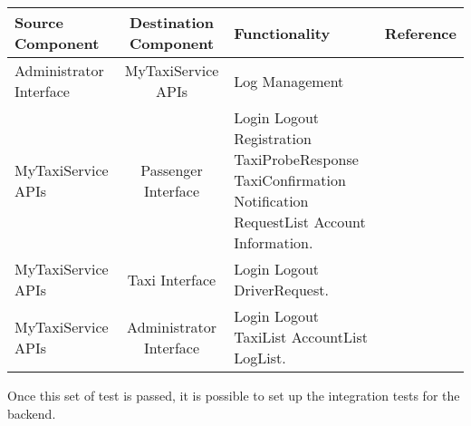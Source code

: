 \documentclass[11pt, a4paper,titlepage]{article}
\begin{document}
	\newpage
	\begin{tabularx}{\textwidth}{| X |c |X |c|}
		\hline \textbf{Source Component} &\textbf{ Destination Component}&\textbf{Functionality} & \textbf{Reference} \\
		\hline Administrator Interface & MyTaxiService APIs & Log Management &\\
		\hline MyTaxiService APIs & Passenger Interface & 
		Login\newline
		Logout\newline
		Registration\newline
		TaxiProbeResponse\newline
		TaxiConfirmation\newline
		Notification\newline
		RequestList\newline
		Account Information.
		&\\
		\hline MyTaxiService APIs & Taxi Interface & 
		Login\newline
		Logout\newline
		DriverRequest.		
		&\\
		\hline MyTaxiService APIs & Administrator Interface & 
		Login\newline
		Logout\newline
		TaxiList\newline
		AccountList\newline
		LogList.
		&\\
		\hline
	\end{tabularx}
	\newline
	\newline
	Once this set of test is passed, it is possible to set up the integration tests for the backend.
	\newline
	\newpage
\end{document}
